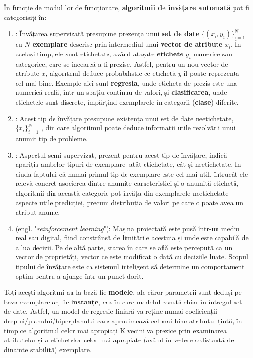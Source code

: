 \documentclass[../../main.tex]{subfiles}
\begin{document}
În funcție de modul lor de funcționare, \textbf{algoritmii de învățare automată} pot fi categorisiți în:

\begin{enumerate}
    \item {}: Învățarea supervizată presupune prezența unui \textbf{set de date} $ \{(x_{i}, y_{i})\}_{i=1}^{N} $ cu $ N $ \textbf{exemplare} descrise prin intermediul unui \textbf{vector de atribute}  $ x_{i} $. În același timp, ele sunt etichetate, având atașate \textbf{etichete} $ y_{i} $ numerice sau categorice, care se încearcă a fi prezise. Astfel, pentru un nou vector de atribute $ x $, algoritmul deduce probabilistic ce etichetă $ y $ îl poate reprezenta cel mai bine. Exemple aici sunt \textbf{regresia}, unde eticheta de prezis este una numerică reală, într-un spațiu continuu de valori, și \textbf{clasificarea}, unde etichetele sunt discrete, împărțind exemplarele în categorii (\textbf{clase}) diferite.
    \item {}: Acest tip de învățare presupune existența unui set de date neetichetate,  $ \{x_{i}\}_{i=1}^{N} $ ,  din care algoritmul poate deduce informații utile rezolvării unui anumit tip de probleme.
    \item {}: Aspectul semi-supervizat, prezent pentru acest tip de învățare, indică apariția ambelor tipuri de exemplare, atât etichetate, cât și neetichetate. În ciuda faptului că numai primul tip de exemplare este cel mai util, întrucât ele relevă concret asocierea dintre a\-numite caracteristici și o anumită etichetă, algoritmii din această categorie pot învăța din exemplarele neetichetate aspecte utile predicției, precum distribuția de valori pe care o poate avea un atribut anume.
    \item {} (engl. "\textit{reinforcement learning}"): Mașina proiectată este pusă într-un mediu real sau digital, fiind constrânsă de limitările acestuia și unde este capabilă de a lua decizii. Pe de altă parte, starea în care se află este percepută ca un vector de proprietăți, vector ce este modificat o dată cu deciziile luate. Scopul tipului de învățare este ca sistemul inteligent să determine un comportament optim pentru a ajunge într-un punct dorit.
\end{enumerate}

Toți acești algoritmi au la bază fie \textbf{modele}, ale căror parametrii sunt deduși pe baza exemplarelor, fie \textbf{instanțe}, caz în care modelul constă chiar în întregul set de date. Astfel, un model de regresie liniară va reține numai coeficienții dreptei/planului/hiperplanului care aproximează cel mai bine atributul țintă, în timp ce algoritmul celor mai apropiați K vecini va prezice prin examinarea atributelor și a etichetelor celor mai apropiate (având în vedere o distanță de dinainte stabilită) exemplare.
\end{document}
